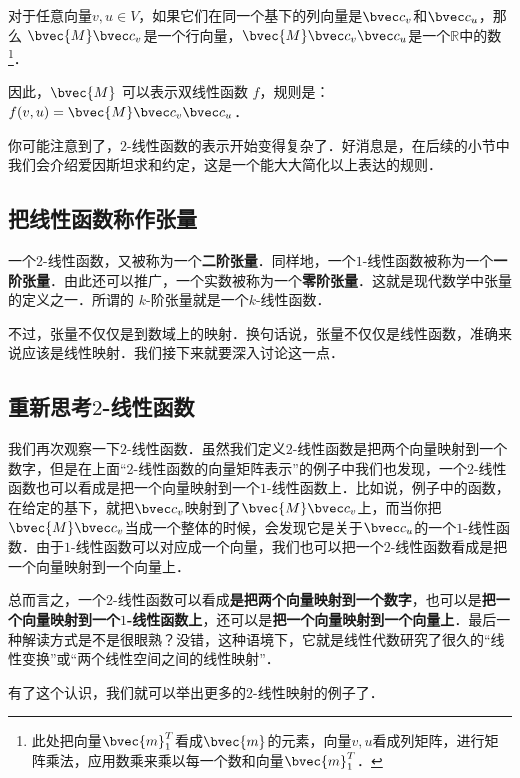 对于任意向量${v}, {u}\in V$，如果它们在同一个基下的列向量是$\bvec c_v$和$\bvec c_u$，那么 $\bvec{M}\bvec c_v$是一个行向量，$\bvec{M}\bvec c_v\bvec c_u$是一个$\mathbb{R}$中的数\footnote{此处把向量$\bvec{m}_1^T$看成$\bvec{m}$的元素，向量${v}, {u}$看成列矩阵，进行矩阵乘法，应用数乘来乘以每一个数和向量$\bvec{m}_1^T$．}．

因此，$\bvec{M}$ 可以表示双线性函数 $f$，规则是：$f({v}, {u})=\bvec{M}\bvec c_v\bvec c_u$．

你可能注意到了，$2$-线性函数的表示开始变得复杂了．好消息是，在后续的小节中我们会介绍爱因斯坦求和约定，这是一个能大大简化以上表达的规则．

\subsection{把线性函数称作张量}

一个$2$-线性函数，又被称为一个\textbf{二阶张量}．同样地，一个$1$-线性函数被称为一个\textbf{一阶张量}．由此还可以推广，一个实数被称为一个\textbf{零阶张量}．这就是现代数学中张量的定义之一．所谓的 $k$-阶张量就是一个$k$-线性函数．

不过，张量不仅仅是到数域上的映射．换句话说，张量不仅仅是线性函数，准确来说应该是线性映射．我们接下来就要深入讨论这一点．

\subsection{重新思考$2$-线性函数}
我们再次观察一下$2$-线性函数．虽然我们定义$2$-线性函数是把两个向量映射到一个数字，但是在上面“$2$-线性函数的向量矩阵表示”的例子中我们也发现，一个$2$-线性函数也可以看成是把一个向量映射到一个$1$-线性函数上．比如说，例子中的函数，在给定的基下，就把$\bvec c_v$映射到了$\bvec{M}\bvec c_v$上，而当你把$\bvec{M}\bvec c_v$当成一个整体的时候，会发现它是关于$\bvec c_u$的一个$1$-线性函数．由于$1$-线性函数可以对应成一个向量，我们也可以把一个$2$-线性函数看成是把一个向量映射到一个向量上．

总而言之，一个$2$-线性函数可以看成\textbf{是把两个向量映射到一个数字}，也可以是\textbf{把一个向量映射到一个$1$-线性函数上}，还可以是\textbf{把一个向量映射到一个向量上}．最后一种解读方式是不是很眼熟？没错，这种语境下，它就是线性代数研究了很久的“线性变换”或“两个线性空间之间的线性映射”．

有了这个认识，我们就可以举出更多的$2$-线性映射的例子了．

